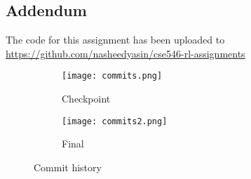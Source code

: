 \documentclass{article} %
\begin{document}
\printbibliography

\subsection*{Addendum}
The code for this assignment has been uploaded to \url{https://github.com/nasheedyasin/cse546-rl-assignments}

\begin{figure}[ht]
    \begin{subfigure}{.45\textwidth}
        \begin{center}
            \texttt{[image: commits.png]}
        \end{center}
        \caption{Checkpoint}
    \end{subfigure}
    \hfill
    \begin{subfigure}{.45\textwidth}
        \begin{center}
            \texttt{[image: commits2.png]}
        \end{center}
        \caption{Final}
    \end{subfigure}
    \caption{Commit history}
\end{figure}
\end{document}
